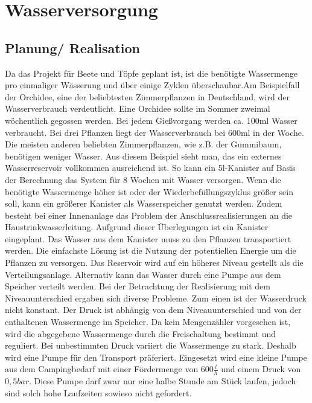 \newpage
\fancyhf{}

\section{Wasserversorgung}

\subsection{Planung/ Realisation}
Da das Projekt für Beete und Töpfe geplant ist, ist die benötigte Wassermenge pro einmaliger
Wässerung und über einige Zyklen überschaubar.Am Beispielfall der Orchidee, eine der beliebtesten
Zimmerpflanzen in Deutschland, wird
der Wasserverbrauch verdeutlicht. Eine Orchidee sollte im Sommer zweimal wöchentlich gegossen werden.
 Bei jedem Gießvorgang werden ca. 100ml Wasser verbraucht. Bei drei Pflanzen liegt der Wasserverbrauch
 bei 600ml in der Woche. Die meisten
anderen beliebten Zimmerpflanzen, wie z.B. der Gummibaum, benötigen weniger Wasser. Aus diesem
Beispiel sieht man, das ein externes Wasserreservoir vollkommen ausreichend ist. So kann ein
5l-Kanister auf Basis der Berechnung
das System für 8 Wochen mit Wasser versorgen. Wenn die benötigte Wassermenge höher ist oder der
Wiederbefüllungszyklus größer sein soll, kann ein größerer Kanister als Wasserspeicher genutzt
werden. Zudem besteht bei einer
Innenanlage das Problem der Anschlussrealisierungen an die Haustrinkwasserleitung. Aufgrund dieser
Überlegungen ist ein Kanister eingeplant.
Das Wasser aus dem Kanister muss zu den Pflanzen transportiert werden. Die einfachste Lösung ist
die Nutzung der potentiellen Energie um die Pflanzen zu versorgen. Das Reservoir wird auf ein höheres
Niveau gestellt als die
Verteilungsanlage. Alternativ kann das Wasser durch eine Pumpe aus dem Speicher verteilt werden.
Bei der Betrachtung der Realisierung mit dem Niveauunterschied ergaben sich diverse Probleme. Zum einen ist der Wasserdruck nicht
konstant. Der Druck ist abhängig von dem Niveauunterschied und von der enthaltenen Wassermenge im
Speicher. Da kein Mengenzähler vorgesehen ist, wird die abgegebene Wassermenge durch die
Freischaltung bestimmt und reguliert. Bei
unbestimmten Druck variiert die Wassermenge zu stark. Deshalb wird eine Pumpe für den Transport
präferiert. Eingesetzt wird eine kleine Pumpe aus dem Campingbedarf mit einer Fördermenge
von $600\frac{l}{h}$ und einem Druck von $0,5 bar$.
Diese Pumpe darf zwar nur eine halbe Stunde am Stück laufen, jedoch sind solch hohe Laufzeiten
sowieso nicht gefordert.
